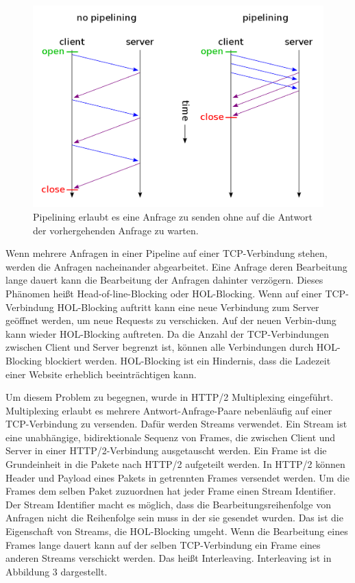 \documentclass{llncs}
\begin{document}
\begin{figure}[!ht]
\includegraphics[width=\columnwidth]{1200px-HTTP_pipelining2}
\caption{Pipelining erlaubt es eine Anfrage zu senden ohne auf die Antwort der vorhergehenden Anfrage zu warten.\cite{Pipelining}}
\end{figure}

Wenn mehrere Anfragen in einer Pipeline auf einer TCP-Verbindung stehen, werden die Anfragen nacheinander abgearbeitet. Eine Anfrage deren Bearbeitung lange dauert kann die Bearbeitung der Anfragen dahinter verzögern. Dieses Phänomen heißt Head-of-line-Blocking oder HOL-Blocking. Wenn auf einer TCP-Verbindung HOL-Blocking auftritt kann eine neue Verbindung zum Server geöffnet werden, um neue Requests zu verschicken. Auf der neuen Verbin-dung kann wieder HOL-Blocking auftreten. Da die Anzahl der TCP-Verbindungen zwischen Client und Server begrenzt ist, können alle Verbindungen durch HOL-Blocking blockiert werden. HOL-Blocking ist ein Hindernis, dass die Ladezeit einer Website erheblich beeinträchtigen kann.

Um diesem Problem zu begegnen, wurde in HTTP/2 Multiplexing eingeführt. Multiplexing erlaubt es mehrere Antwort-Anfrage-Paare nebenläufig auf einer TCP-Verbindung zu versenden. Dafür werden Streams verwendet.
Ein Stream ist eine unabhängige, bidirektionale Sequenz von Frames, die zwischen Client und Server in einer HTTP/2-Verbindung ausgetauscht werden.\cite{Belshe2015}
Ein Frame ist die Grundeinheit in die Pakete nach HTTP/2 aufgeteilt werden. In HTTP/2 können Header und Payload eines Pakets in getrennten Frames versendet werden. Um die Frames dem selben Paket zuzuordnen hat jeder Frame einen Stream Identifier. Der Stream Identifier macht es möglich, dass die Bearbeitungsreihenfolge von Anfragen nicht die Reihenfolge sein muss in der sie gesendet wurden. Das ist die Eigenschaft von Streams, die HOL-Blocking umgeht. Wenn die Bearbeitung eines Frames lange dauert kann auf der selben TCP-Verbindung ein Frame eines anderen Streams verschickt werden. Das heißt Interleaving. Interleaving ist in Abbildung 3 dargestellt.
\end{document}
